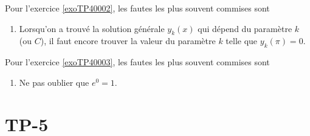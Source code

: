 Pour l'exercice \ref{exoTP40002}, les fautes les plus souvent commises sont
\begin{enumerate}

	\item
		Lorsqu'on a trouvé la solution générale $y_k(x)$ qui dépend du paramètre $k$ (ou $C$), il faut encore trouver la valeur du paramètre $k$ telle que $y_k(\pi)=0$.

\end{enumerate}


Pour l'exercice \ref{exoTP40003}, les fautes les plus souvent commises sont
\begin{enumerate}

	\item
		Ne pas oublier que $e^0=1$.

\end{enumerate}


\section{TP-5}
